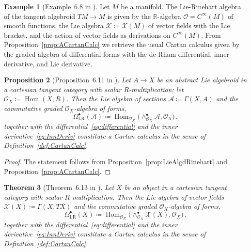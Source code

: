 \documentclass[12pt,reqno, a4paper]{amsart}
\numberwithin{equation}{section}
\theoremstyle{plain}
\newtheorem{Theorem}{Theorem}[section]
\newtheorem{Proposition}[Theorem]{Proposition}
\theoremstyle{definition}
\newtheorem{Example}[Theorem]{Example}
\theoremstyle{remark}
\DeclareMathOperator{\Hom}{Hom}
\newcommand{\bbR}{\mathbb{R}}
\newcommand{\calA}{\mathcal{A}}
\newcommand{\calO}{\mathcal{O}}
\newcommand{\calX}{\mathcal{X}}
\begin{document}
\begin{Example}[Example~6.8 in \cite{AintablianBlohmann:2026}]
Let $M$ be a manifold. The Lie-Rinehart algebra of the tangent algebroid $TM \to M$ is given by the $\bbR$-algebra $\calO = C^\infty(M)$ of smooth functions, the Lie algebra $\calX \coloneqq \calX(M)$ of vector fields with the Lie bracket, and the action of vector fields as derivations on $C^\infty(M)$. From Proposition~\ref{prop:ACartanCalc} we retrieve the usual Cartan calculus given by the graded algebra of differential forms with the de Rham differential, inner derivative, and Lie derivative.
\end{Example}

\begin{Proposition}[Proposition~6.11 in \cite{AintablianBlohmann:2026}]
\label{prop:CartanOnA}
Let $A \to X$ be an abstract Lie algebroid in a cartesian tangent category with scalar $R$-multiplication; let $\calO_X \coloneqq \Hom(X,R)$. Then the Lie algebra of sections $\calA \coloneqq \Gamma(X,A)$ and the commutative graded $\calO_X$-algebra of forms,
\begin{equation*}
  \Omega_\mathrm{LR}^\bullet(\calA)
  \coloneqq
  \Hom_{\calO_X}\bigl(\wedge^\bullet_{\calO_X} \calA,
    \calO_X \bigr)
  \,,
\end{equation*}
together with the differential~\eqref{eq:differential} and the inner derivative~\eqref{eq:InnDeriv} constitute a Cartan calculus in the sense of Definition~\ref{def:CartanCalc}.
\end{Proposition}
\begin{proof}
The statement follows from Proposition~\ref{prop:LieAlgdRinehart} and Proposition~\ref{prop:ACartanCalc}.
\end{proof}

\begin{Theorem}[Theorem~6.13 in \cite{AintablianBlohmann:2026}]
\label{thm:CartanOnX}
Let $X$ be an object in a cartesian tangent category with scalar $R$-multiplication. Then the Lie algebra of vector fields $\calX(X) \coloneqq \Gamma(X,TX)$ and the commutative graded $\calO_X$-algebra of forms,
\begin{equation*}
  \Omega_\mathrm{LR}^\bullet(X)
  \coloneqq
  \Hom_{\calO_X}\bigl(\wedge^\bullet_{\calO_X} \calX(X),
    \calO_X \bigr)
  \,,
\end{equation*}
together with the differential~\eqref{eq:differential} and the inner derivative~\eqref{eq:InnDeriv} constitute a Cartan calculus in the sense of Definition~\ref{def:CartanCalc}.
\end{Theorem}
\end{document}

